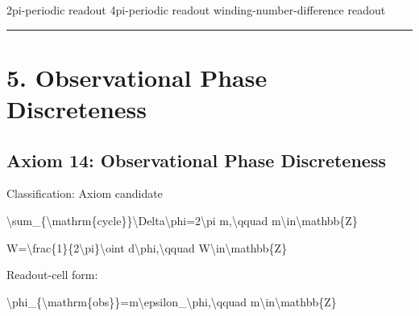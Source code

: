\documentclass[
  a4paper]{article}
\newenvironment{Shaded}{}{}
\newcommand{\NormalTok}[1]{#1}
\begin{document}
\begin{Shaded}
\begin{Highlighting}[]
\NormalTok{2pi{-}periodic readout}
\NormalTok{4pi{-}periodic readout}
\NormalTok{winding{-}number{-}difference readout}
\end{Highlighting}
\end{Shaded}

\begin{center}\rule{0.5\linewidth}{0.5pt}\end{center}

\section{5. Observational Phase
Discreteness}\label{observational-phase-discreteness}

\subsection{Axiom 14: Observational Phase
Discreteness}\label{axiom-14-observational-phase-discreteness}

Classification: Axiom candidate

\begin{Shaded}
\begin{Highlighting}[]
\NormalTok{\textbackslash{}sum\_\{\textbackslash{}mathrm\{cycle\}\}\textbackslash{}Delta\textbackslash{}phi=2\textbackslash{}pi m,\textbackslash{}qquad m\textbackslash{}in\textbackslash{}mathbb\{Z\}}
\end{Highlighting}
\end{Shaded}

\begin{Shaded}
\begin{Highlighting}[]
\NormalTok{W=\textbackslash{}frac\{1\}\{2\textbackslash{}pi\}\textbackslash{}oint d\textbackslash{}phi,\textbackslash{}qquad W\textbackslash{}in\textbackslash{}mathbb\{Z\}}
\end{Highlighting}
\end{Shaded}

Readout-cell form:

\begin{Shaded}
\begin{Highlighting}[]
\NormalTok{\textbackslash{}phi\_\{\textbackslash{}mathrm\{obs\}\}=m\textbackslash{}epsilon\_\textbackslash{}phi,\textbackslash{}qquad m\textbackslash{}in\textbackslash{}mathbb\{Z\}}
\end{Highlighting}
\end{Shaded}
\end{document}
